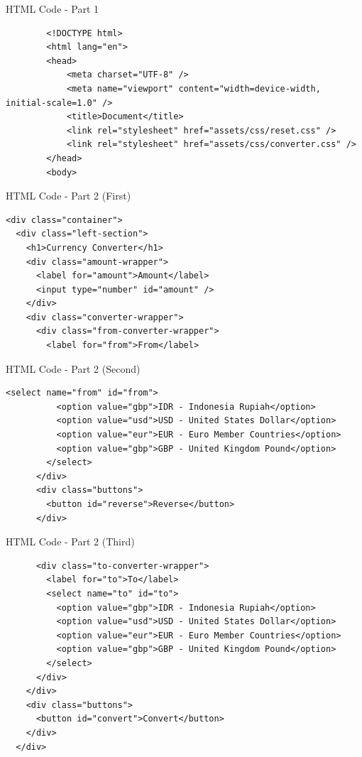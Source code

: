 \documentclass[aspectratio=169, table]{beamer}
\begin{document}
	\begin{frame}[fragile]{HTML Code - Part 1}
		\begin{verbatim}
		<!DOCTYPE html>
		<html lang="en">
		<head>
		    <meta charset="UTF-8" />
		    <meta name="viewport" content="width=device-width, initial-scale=1.0" />
		    <title>Document</title>
		    <link rel="stylesheet" href="assets/css/reset.css" />
		    <link rel="stylesheet" href="assets/css/converter.css" />
		</head>
		<body>
		\end{verbatim}
	\end{frame}
	
	\begin{frame}[fragile]{HTML Code - Part 2 (First)}
\begin{verbatim}
<div class="container">
  <div class="left-section">
    <h1>Currency Converter</h1>
    <div class="amount-wrapper">
      <label for="amount">Amount</label>
      <input type="number" id="amount" />
    </div>
    <div class="converter-wrapper">
      <div class="from-converter-wrapper">
        <label for="from">From</label>
\end{verbatim}
\end{frame}

\begin{frame}[fragile]{HTML Code - Part 2 (Second)}
\begin{verbatim}
<select name="from" id="from">
          <option value="gbp">IDR - Indonesia Rupiah</option>
          <option value="usd">USD - United States Dollar</option>
          <option value="eur">EUR - Euro Member Countries</option>
          <option value="gbp">GBP - United Kingdom Pound</option>
        </select>
      </div>
      <div class="buttons">
        <button id="reverse">Reverse</button>
      </div>
\end{verbatim}
\end{frame}

\begin{frame}[fragile]{HTML Code - Part 2 (Third)}
\begin{verbatim}
      <div class="to-converter-wrapper">
        <label for="to">To</label>
        <select name="to" id="to">
          <option value="gbp">IDR - Indonesia Rupiah</option>
          <option value="usd">USD - United States Dollar</option>
          <option value="eur">EUR - Euro Member Countries</option>
          <option value="gbp">GBP - United Kingdom Pound</option>
        </select>
      </div>
    </div>
    <div class="buttons">
      <button id="convert">Convert</button>
    </div>
  </div>
\end{verbatim}
\end{frame}
\end{document}
